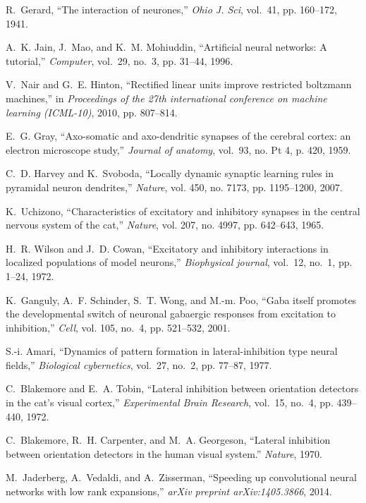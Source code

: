 \documentclass[conference]{IEEEtran}
\begin{document}
\begin{thebibliography}{10}
R.~Gerard, ``The interaction of neurones,'' \emph{Ohio J. Sci}, vol.~41, pp.
160--172, 1941.

A.~K. Jain, J.~Mao, and K.~M. Mohiuddin, ``Artificial neural networks: A
tutorial,'' \emph{Computer}, vol.~29, no.~3, pp. 31--44, 1996.

V.~Nair and G.~E. Hinton, ``Rectified linear units improve restricted boltzmann
machines,'' in \emph{Proceedings of the 27th international conference on
machine learning (ICML-10)}, 2010, pp. 807--814.

E.~G. Gray, ``Axo-somatic and axo-dendritic synapses of the cerebral cortex: an
electron microscope study,'' \emph{Journal of anatomy}, vol.~93, no. Pt 4, p.
420, 1959.

C.~D. Harvey and K.~Svoboda, ``Locally dynamic synaptic learning rules in
pyramidal neuron dendrites,'' \emph{Nature}, vol. 450, no. 7173, pp.
1195--1200, 2007.

K.~Uchizono, ``Characteristics of excitatory and inhibitory synapses in the
central nervous system of the cat,'' \emph{Nature}, vol. 207, no. 4997, pp.
642--643, 1965.

H.~R. Wilson and J.~D. Cowan, ``Excitatory and inhibitory interactions in
localized populations of model neurons,'' \emph{Biophysical journal},
vol.~12, no.~1, pp. 1--24, 1972.

K.~Ganguly, A.~F. Schinder, S.~T. Wong, and M.-m. Poo, ``Gaba itself promotes
the developmental switch of neuronal gabaergic responses from excitation to
inhibition,'' \emph{Cell}, vol. 105, no.~4, pp. 521--532, 2001.

S.-i. Amari, ``Dynamics of pattern formation in lateral-inhibition type neural
  fields,'' \emph{Biological cybernetics}, vol.~27, no.~2, pp. 77--87, 1977.

C.~Blakemore and E.~A. Tobin, ``Lateral inhibition between orientation
detectors in the cat's visual cortex,'' \emph{Experimental Brain Research},
vol.~15, no.~4, pp. 439--440, 1972.

C.~Blakemore, R.~H. Carpenter, and M.~A. Georgeson, ``Lateral inhibition
between orientation detectors in the human visual system.'' \emph{Nature},
1970.

M.~Jaderberg, A.~Vedaldi, and A.~Zisserman, ``Speeding up convolutional neural
networks with low rank expansions,'' \emph{arXiv preprint arXiv:1405.3866},
2014.


\end{thebibliography}
\end{document}
